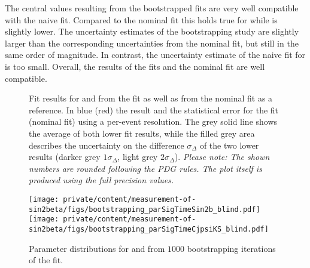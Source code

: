 The central values resulting from the bootstrapped \sPlot fits are very well
compatible with the naive \sPlot fit. Compared to the nominal fit this holds
true for \CJpsiKS while \SJpsiKS is slightly lower. The uncertainty estimates of
the bootstrapping study are slightly larger than the corresponding uncertainties
from the nominal fit, but still in the same order of magnitude. In contrast, the
uncertainty estimate of the naive \sPlot fit for \SJpsiKS is too small. Overall,
the results of the \sPlot fits and the nominal fit are well compatible.
%
\begin{figure}
\centering


\caption{
Fit results for \SJpsiKS and \CJpsiKS from the \sPlot fit as well as from the
nominal fit as a reference. In blue (red) the result and the statistical error
for the \sPlot fit (nominal fit) using a per-event resolution. The grey solid
line shows the average of both lower fit results, while the filled grey area
describes the uncertainty on the difference $\sigma_\Delta$ of the two lower
results (darker grey $1\sigma_\Delta$, light grey $2\sigma_\Delta$).
\textit{Please note: The shown numbers are rounded following the PDG rules. The
plot itself is produced using the full precision values.}}
\label{fig:measurement_of_sin2beta:systematics:cross_checks:splot_fit:s_and_c}
\end{figure}
%
\begin{figure}
\centering
\texttt{[image: private/content/measurement-of-sin2beta/figs/bootstrapping\_parSigTimeSin2b\_blind.pdf]}
\hfill
\texttt{[image: private/content/measurement-of-sin2beta/figs/bootstrapping\_parSigTimeCjpsiKS\_blind.pdf]}
\caption{
Parameter distributions for \SJpsiKS and \CJpsiKS from $\num{1000}$
bootstrapping iterations of the \sPlot fit.}
\label{fig:measurement_of_sin2beta:systematics:cross_checks:splot_fit:bootstrapping}
\end{figure}

